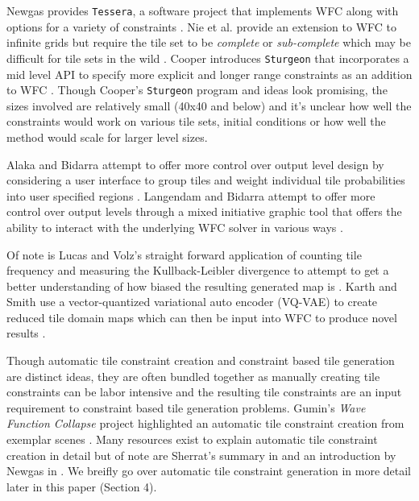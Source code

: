 Newgas provides \texttt{Tessera}, a software project that implements WFC along with options for a variety of constraints \cite{Newgas_2021}.
Nie et al. provide an extension to WFC to infinite grids but require the tile set to be \textit{complete} or \textit{sub-complete}
which may be difficult for tile sets in the wild \cite{Nie_etall_2023}.
Cooper introduces \texttt{Sturgeon} that incorporates a mid level API to specify more explicit and longer range constraints as an addition
to WFC \cite{Cooper_2022}.
Though Cooper's \texttt{Sturgeon} program and ideas look promising, the sizes involved are relatively small (40x40 and below)
and it's unclear how well the constraints would work on various tile sets, initial conditions or how well the method would scale
for larger level sizes.

Alaka and Bidarra attempt to offer more control over output level design by considering a user interface to group tiles and
weight individual tile probabilities into user specified regions \cite{Alaka_Bidarra_Rafael_2023}.
Langendam and Bidarra attempt to offer more control over output levels through a mixed initiative graphic tool that offers
the ability to interact with the underlying WFC solver in various ways \cite{Langendam_etall_2022}.

Of note is Lucas and Volz's straight forward application of counting tile frequency and measuring the Kullback-Leibler divergence
to attempt to get a better understanding of how biased the resulting generated map is \cite{Lucas_Volz_2019}.
Karth and Smith use a vector-quantized variational auto encoder (VQ-VAE) to create reduced tile domain maps which can then
be input into WFC to produce novel results \cite{Karth_Smith_2017}.


Though automatic tile constraint creation and constraint based tile generation are distinct ideas, they are often
bundled together as manually creating tile constraints can be labor intensive and the resulting tile constraints
are an input requirement to constraint based tile generation problems.
Gumin's \textit{Wave Function Collapse} project highlighted an automatic tile constraint creation from exemplar
scenes \cite{Gumin_2016}.
Many resources exist to explain automatic tile constraint creation in detail but of note are Sherrat's summary in
\cite{Sherratt_2019} and an introduction by Newgas in \cite{BorisTheBrave_wfc_2021}.
We breifly go over automatic tile constraint generation in more detail later in this paper (Section 4).

